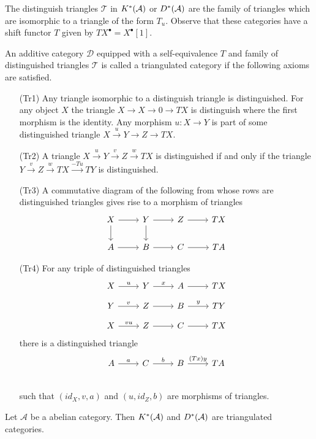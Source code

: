 The distinguish triangles $\mathcal{T}$ in $K^*(\AA)$ or $D^*(\AA)$ are the family of triangles which are isomorphic to a triangle of the form $T_u$.
Observe that these categories have a shift functor $T$ given by $TX^\bullet = X^\bullet[1]$.
\begin{definition}
 An additive category $\mathcal{D}$ equipped with a self-equivalence $T$ and family of distinguished triangles $\mathcal{T}$ is called a triangulated category if the following axioms are satisfied.
 \begin{enumerate}
   \item[(Tr1)] Any triangle isomorphic to a distinguish triangle is distinguished. For any object $X$ the triangle $X\to X \to 0 \to TX$ is distinguish where the first morphism is the identity.
   Any morphism $u:X\to Y$ is part of some distinguished triangle $X\xrightarrow{u} Y \to Z \to TX$.
   \item[(Tr2)] A triangle $X\xrightarrow{u} Y \xrightarrow{v} Z \xrightarrow{w} TX$ is distinguished if and only if the triangle $Y \xrightarrow{v} Z \xrightarrow{w} TX \xrightarrow{-Tu} TY$ is distinguished.
   \item[(Tr3)] A commutative diagram of the following from whose rows are distinguished triangles gives rise to a morphism of triangles
   $$
     \begin{tikzcd}
       X\arrow{d}\rar& Y\arrow{d}\rar & Z\rar & TX\\
       A\rar& B\rar & C\rar & TA
     \end{tikzcd}
    $$
   \item[(Tr4)] For any triple of distinguished triangles
   $$
     \begin{tikzcd}[row sep=small]
       X \arrow{r}{u} & Y \arrow{r}{x}& A \arrow{r}{} & TX \\
       Y \arrow{r}{v} & Z \arrow{r}{}& B \arrow{r}{y} & TY\\
       X \arrow{r}{vu} & Z\arrow{r}{} & C\arrow{r}{} & TX
     \end{tikzcd}
   $$
   there is a distinguished triangle
   $$\begin{tikzcd}
     A \arrow{r}{a} & C \arrow{r}{b}& B \arrow{r}{(Tx)y} & TA \\
   \end{tikzcd} $$
   such that $(id_X, v,a)$ and $(u,id_Z,b)$ are morphisms of triangles.
   \end{enumerate}
\end{definition}
\begin{proposition}
 Let $\mathcal{A}$ be a abelian category. Then $K^*(\AA)$ and $D^*(\AA)$ are triangulated categories.
\end{proposition}
